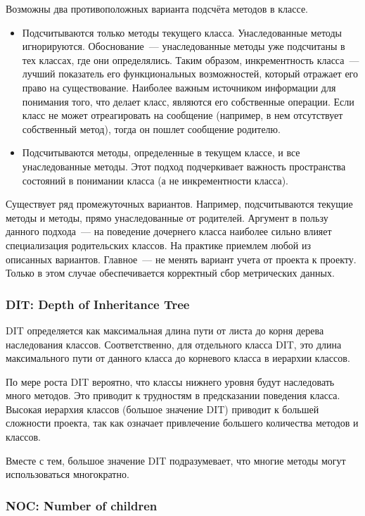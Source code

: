 \documentclass{../../text-style}
\begin{document}
Возможны два противоположных варианта подсчёта методов в классе.

\begin{itemize}
    \item Подсчитываются только методы текущего класса. Унаследованные методы игнорируются. Обоснование~--- унаследованные методы уже подсчитаны в тех классах, где они определялись. Таким образом, инкрементность класса~--- лучший показатель его функциональных возможностей, который отражает его право на существование. Наиболее важным источником информации для понимания того, что делает класс, являются его собственные операции. Если класс не может отреагировать на сообщение (например, в нем отсутствует собственный метод), тогда он пошлет сообщение родителю.
    \item Подсчитываются методы, определенные в текущем классе, и все унаследованные методы. Этот подход подчеркивает важность пространства состояний в понимании класса (а не инкрементности класса).
\end{itemize}

Существует ряд промежуточных вариантов. Например, подсчитываются текущие методы и методы, прямо унаследованные от родителей. Аргумент в пользу данного подхода~--- на поведение дочернего класса наиболее сильно влияет специализация родительских классов.
На практике приемлем любой из описанных вариантов. Главное~--- не менять вариант учета от проекта к проекту. Только в этом случае обеспечивается корректный сбор метрических данных.

\subsubsection{DIT: Depth of Inheritance Tree}

DIT определяется как максимальная длина пути от листа до корня дерева наследования классов. Соответственно, для отдельного класса DIT, это длина максимального пути от данного класса до корневого класса в иерархии классов.

По мере роста DIT вероятно, что классы нижнего уровня будут наследовать много методов. Это приводит к трудностям в предсказании поведения класса. Высокая иерархия классов (большое значение DIT) приводит к большей сложности проекта, так как означает привлечение большего количества методов и классов.

Вместе с тем, большое значение DIT подразумевает, что многие методы могут использоваться многократно.

\subsubsection{NOC: Number of children}
\end{document}
